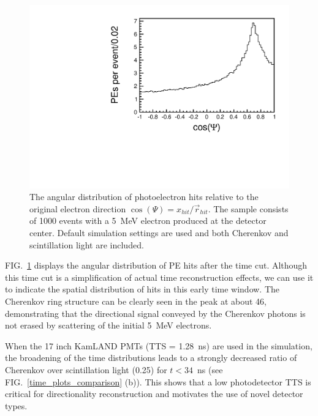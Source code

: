 \documentclass[aps,prc,twocolumn,groupedaddress,showpacs,amsmath,amssymb,floatfix,superscriptaddress]{revtex4}
\begin{document}
\begin{figure}
        \begin{center}
        \includegraphics[scale=0.40]{graphs/cos_psi_34_h.pdf}
        \caption[]{The angular distribution of photoelectron hits
        relative to the original electron direction $\cos(\Psi) =
        x_{hit}/\vec{r}_{hit}$. The sample consists of 1000 events
        with a 5~MeV electron produced at the detector center. Default
        simulation settings are used and both Cherenkov and
        scintillation light are included. } 
        \label{Cherenkov_cone}
        \end{center}
\end{figure}

FIG.~\ref{Cherenkov_cone} displays the angular distribution of PE
hits after the time cut. Although this time cut is a simplification of actual time
reconstruction effects, we can use it to indicate the spatial
distribution of hits in this early time window. The Cherenkov ring structure
can be clearly seen in the peak at about 46\textdegree, demonstrating
that the directional signal conveyed by the Cherenkov photons is not
erased by scattering of the initial 5~MeV electrons.

When the 17 inch KamLAND PMTs \cite{tajimaMaster,kume_1983} (TTS =
1.28~ns) are used in the simulation, the broadening of the time
distributions leads to a strongly decreased ratio of Cherenkov over
scintillation light (0.25) for $t<34$~ns (see
FIG.~\ref{time_plots_comparison} (b)). This shows that a low
photodetector TTS is critical for directionality reconstruction and
motivates the use of novel detector types.
\end{document}
